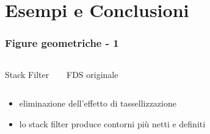 \documentclass{beamer}
\begin{document}
\section{Esempi e Conclusioni}


\begin{frame}
 
  \frametitle{Figure geometriche - 1}

  \begin{columns}

    \begin{center}
Stack Filter\\  
\vspace*{-0.5em}
    \begin{figure}
      
    \end{figure}
    \end{center}

    \begin{center}
FDS originale\\
\vspace*{-0.5em}
    \begin{figure}
      
    \end{figure}
    \end{center}

  \end{columns}

  \begin{block}{}
   \begin{itemize}
    \item eliminazione dell'effetto di tassellizzazione
    \item lo stack filter produce contorni pi\`u netti e definiti 
   \end{itemize}
  \end{block}

\end{frame}
\end{document}
